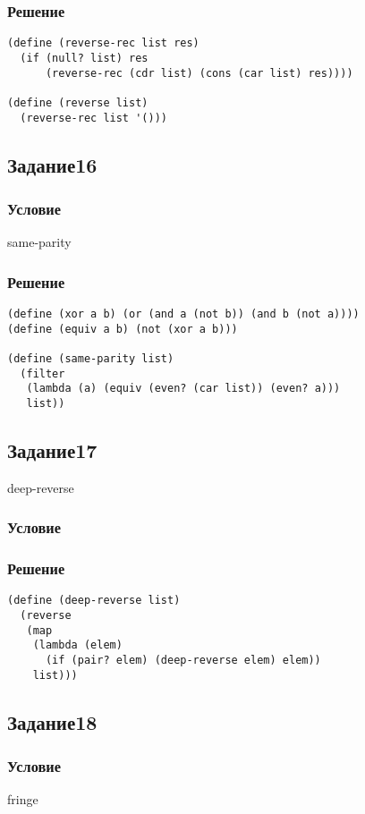 \documentclass[10pt,a4paper]{article}
\begin{document}
\subsubsection*{Решение}

\begin{lstlisting}
(define (reverse-rec list res)
  (if (null? list) res
      (reverse-rec (cdr list) (cons (car list) res))))

(define (reverse list)
  (reverse-rec list '()))
\end{lstlisting}

\subsection*{Задание16}
\subsubsection*{Условие}
same-parity
\subsubsection*{Решение}
\begin{lstlisting}
(define (xor a b) (or (and a (not b)) (and b (not a))))
(define (equiv a b) (not (xor a b)))

(define (same-parity list)
  (filter
   (lambda (a) (equiv (even? (car list)) (even? a)))
   list))
\end{lstlisting}

\subsection*{Задание17}
deep-reverse
\subsubsection*{Условие}
\subsubsection*{Решение}
\begin{lstlisting}
(define (deep-reverse list)
  (reverse 
   (map
    (lambda (elem)
      (if (pair? elem) (deep-reverse elem) elem))
    list)))
\end{lstlisting}

\subsection*{Задание18}
\subsubsection*{Условие}
fringe
\end{document}

